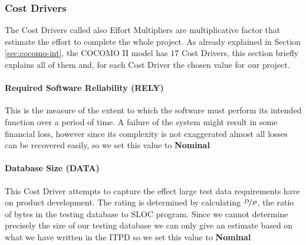 \subsubsection{Cost Drivers}
\label{sec:cd}
The Cost Drivers called also Effort Multipliers are multiplicative factor that estimate the effort to complete the whole project. As already explained in Section \ref{sec:cocomo-int}, the COCOMO II model has 17 Cost Drivers, this section briefly explains all of them and, for each Cost Driver the chosen value for our project. \\

\paragraph{Required Software Reliability (RELY)} This is the measure of the extent to which the software must perform its intended function over a period of time. A failure of the system might result in some financial loss, however since its complexity is not exaggerated almost all losses can be recovered easily, so we set this value to \textbf{Nominal} 

\paragraph{Database Size (DATA)} This Cost Driver attempts to capture the effect large test data requirements have on product development. The rating is determined by calculating $\nicefrac{D}{P}$, the ratio of bytes in the testing database to SLOC program. Since we cannot determine precisely the size of our testing database we can only give an estimate based on what we have written in the ITPD so we set this value to \textbf{Nominal}



